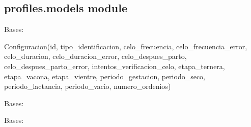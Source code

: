 \documentclass[letterpaper,10pt,english]{sphinxmanual}
\begin{document}
\subsection{profiles.models module}
\label{profiles:profiles-models-module}\label{profiles:module-profiles.models}

\begin{fulllineitems}
\label{profiles:profiles.models.Configuracion}
Bases: 

Configuracion(id, tipo\_identificacion, celo\_frecuencia, celo\_frecuencia\_error, celo\_duracion, celo\_duracion\_error, celo\_despues\_parto, celo\_despues\_parto\_error, intentos\_verificacion\_celo, etapa\_ternera, etapa\_vacona, etapa\_vientre, periodo\_gestacion, periodo\_seco, periodo\_lactancia, periodo\_vacio, numero\_ordenios)

\begin{fulllineitems}
\label{profiles:profiles.models.Configuracion.DoesNotExist}
Bases: 

\end{fulllineitems}


\begin{fulllineitems}
\label{profiles:profiles.models.Configuracion.IDENTIFICACION_CHOICES}
\end{fulllineitems}


\begin{fulllineitems}
\label{profiles:profiles.models.Configuracion.MultipleObjectsReturned}
Bases: 

\end{fulllineitems}



\end{fulllineitems}
\end{document}
